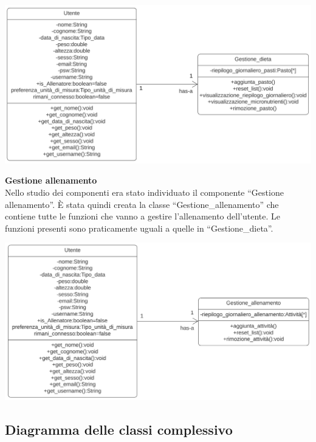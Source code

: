 \documentclass{article}
\begin{document}
      \begin{center}
            \includegraphics[scale=0.5]{classi/Gestione_dieta.png}
      \end{center}

      {\large\textbf{Gestione allenamento}}\\

      Nello studio dei componenti era stato individuato il componente “Gestione allenamento”. È stata quindi creata la classe “Gestione\_allenamento” che contiene tutte le funzioni che vanno a gestire l’allenamento dell’utente. Le funzioni presenti sono praticamente uguali a quelle in “Gestione\_dieta”.
      
      \begin{center}
            \includegraphics[scale=0.5]{classi/Gestione_allenamento.png}
      \end{center}
      
      \hfill \break
      \hfill \break
      
       \subsection{Diagramma delle classi complessivo}
    
\end{document}
